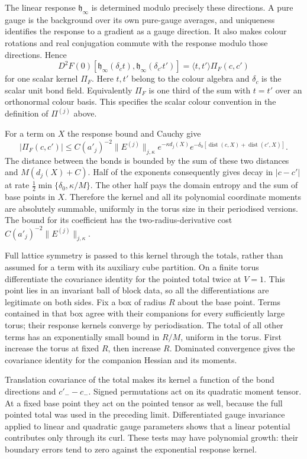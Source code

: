 \documentclass[11pt,letterpaper,reqno]{amsart}
\theoremstyle{definition}
\theoremstyle{remark}
\begin{document}
The linear response $\mathfrak h_\infty$ is determined
modulo precisely these directions. A pure gauge is the
background over its own pure-gauge averages, and
uniqueness identifies the response to a gradient as
a gauge direction. It also makes colour rotations and
real conjugation commute with the response modulo
those directions. Hence
\[
 D^2F(0)[\mathfrak h_\infty(\delta_ct),
                     \mathfrak h_\infty(\delta_{c'}t')]
          =\langle t,t'\rangle\Pi_F(c,c')
\]
for one scalar kernel $\Pi_F$. Here $t,t'$ belong to
the colour algebra and $\delta_c$ is the scalar unit
bond field. Equivalently $\Pi_F$ is one third of the
sum with $t=t'$ over an orthonormal colour basis.
This specifies the scalar colour convention in the
definition of $\Pi^{(j)}$ above.

For a term on $X$ the response bound and Cauchy give
\[
 |\Pi_F(c,c')|
  \le C(a'_j)^{-2}\|E^{(j)}\|_{j,\kappa}
       e^{-\kappa d_j(X)}
       e^{-\delta_0[\operatorname{dist}(c,X)
                              +\operatorname{dist}(c',X)]}.
\]
The distance between the bonds is bounded by the sum
of these two distances and $M(d_j(X)+C)$. Half of
the exponents consequently gives decay in $|c-c'|$
at rate $\frac12\min\{\delta_0,\kappa/M\}$.
The other half pays the domain entropy and the sum
of base points in $X$. Therefore the kernel and all
its polynomial coordinate moments are absolutely
summable, uniformly in the torus size in their
periodised versions. The bound for its coefficient
has the two-radius-derivative cost
$C(a'_j)^{-2}\|E^{(j)}\|_{j,\kappa}$.

Full lattice symmetry is passed to this kernel
through the totals, rather than assumed for a term
with its auxiliary cube partition. On a finite
torus differentiate the covariance identity for
the pointed total twice at $V=1$. This point lies
in an invariant ball of block data, so all the
differentiations are legitimate on both sides.
Fix a box of radius $R$ about the base point.
Terms contained in that box agree with their
companions for every sufficiently large torus;
their response kernels converge by periodisation.
The total of all other terms has an exponentially
small bound in $R/M$, uniform in the torus.
First increase the torus at fixed $R$, then
increase $R$. Dominated convergence gives the
covariance identity for the companion Hessian
and its moments.

Translation covariance of the total makes its
kernel a function of the bond directions and
$c'_--c_-$. Signed permutations act on its
quadratic moment tensor. At a fixed base point
they act on the pointed tensor as well, because
the full pointed total was used in the preceding
limit. Differentiated gauge invariance applied
to linear and quadratic gauge parameters shows
that a linear potential contributes only
through its curl. These tests may have polynomial
growth: their boundary errors tend to zero
against the exponential response kernel.
\end{document}

